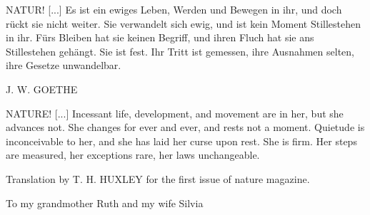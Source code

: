 
\begin{dedication} %

  NATUR! [...] Es ist ein ewiges Leben, Werden und Bewegen in ihr, und
  doch r\"uckt sie nicht weiter. Sie verwandelt sich ewig, und ist kein
  Moment Stillestehen in ihr. F\"urs Bleiben hat sie keinen Begriff, und
  ihren Fluch hat sie ans Stillestehen geh\"angt. Sie ist fest. Ihr
  Tritt ist gemessen, ihre Ausnahmen selten, ihre Gesetze unwandelbar.\\
  \begin{flushleft}
    J. W. GOETHE
  \end{flushleft}
  
  \vspace{1cm}

  NATURE! [...] Incessant life, development, and movement are in her,
  but she advances not. She changes for ever and ever, and rests not a
  moment. Quietude is inconceivable to her, and she has laid her curse
  upon rest. She is firm. Her steps are measured, her exceptions rare,
  her laws unchangeable.\\
  \begin{flushleft} 
    Translation by T. H. HUXLEY for the first issue of nature magazine.
 \end{flushleft}

  \vspace{3cm}

  To my grandmother Ruth and my wife Silvia

\end{dedication}

